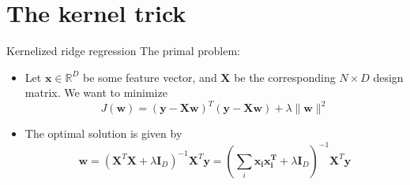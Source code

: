 \documentclass[10pt,mathserif]{beamer}
\begin{document}
\section{The kernel trick}
\begin{frame}{Kernelized ridge regression}
The primal problem:
\begin{itemize}
    \item Let $\bm{x} \in \mathbb{R}^D$ be some feature vector, and $\bm{X}$ be the corresponding $N \times D$ design matrix. We want to minimize
    \begin{equation*}
        J(\bm{w}) = (\bm{y} - \bm{X}\bm{w})^T (\bm{y} - \bm{X}\bm{w}) + \lambda\|\bm{w}\|^2
    \end{equation*} 
    \item The optimal solution is given by
    \begin{equation*}
        \bm{w} = (\bm{X}^T \bm{X}+\lambda \bm{I}_D)^{-1} \bm{X}^T \bm{y} =(\sum_i \bm{\bm{x}_i\bm{x}_i^T} +\lambda \bm{I}_D)^{-1}\bm{X}^T \bm{y}
    \end{equation*}
\end{itemize}
\end{frame}
        
\end{document}
